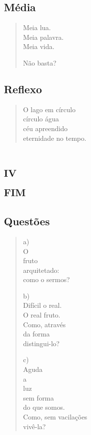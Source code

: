 \chapter{Média}

\begin{verse}
Meia lua.\\
Meia palavra.\\
Meia vida.

Não basta?
\end{verse}

\chapter{Reflexo}

\begin{verse}
O lago em círculo\\
círculo água\\
céu apreendido\\
eternidade no tempo.
\end{verse}

\part*{\textsc{iv}\\\textsc{fim}}


\chapter{Questões}

\begin{verse}
a)\\
O\\
fruto\\
arquitetado:\\
como o sermos?

b)\\
Difícil o real.\\
O real fruto.\\
Como, através\\
da forma\\
distingui-lo?

c)\\
Aguda\\
a\\
luz\\
sem forma\\
do que somos.\\
Como, sem vacilações\\
vivê-la?
\end{verse}

